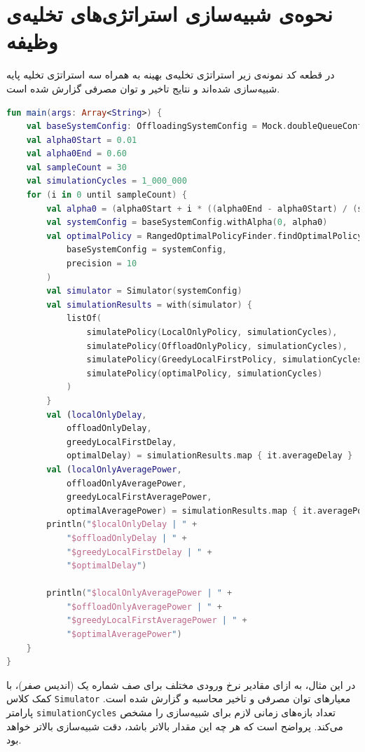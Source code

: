 \section{نحوه‌ی شبیه‌سازی استراتژی‌های تخلیه‌ی وظیفه}
در قطعه کد نمونه‌ی زیر استراتژی تخلیه‌ی بهینه به همراه سه استراتژی تخلیه پایه شبیه‌سازی شده‌اند و نتایج تاخیر و توان مصرفی گزارش شده است.
\begin{LTR}
	\begin{lstlisting}[language=Kotlin, caption={شبیه‌سازی استراتژی‌های تخلیه‌ی وظیفه}, captiondirection=RTL, label={lst:sim}, showstringspaces=false]
fun main(args: Array<String>) {
	val baseSystemConfig: OffloadingSystemConfig = Mock.doubleQueueConfig()
	val alpha0Start = 0.01
	val alpha0End = 0.60
	val sampleCount = 30
	val simulationCycles = 1_000_000
	for (i in 0 until sampleCount) {
		val alpha0 = (alpha0Start + i * ((alpha0End - alpha0Start) / (sampleCount - 1)))
		val systemConfig = baseSystemConfig.withAlpha(0, alpha0)
		val optimalPolicy = RangedOptimalPolicyFinder.findOptimalPolicy(
			baseSystemConfig = systemConfig,
			precision = 10
		)
		val simulator = Simulator(systemConfig)
		val simulationResults = with(simulator) {
			listOf(
				simulatePolicy(LocalOnlyPolicy, simulationCycles),
				simulatePolicy(OffloadOnlyPolicy, simulationCycles),
				simulatePolicy(GreedyLocalFirstPolicy, simulationCycles),
				simulatePolicy(optimalPolicy, simulationCycles)
			)
		}
		val (localOnlyDelay,
			offloadOnlyDelay,
			greedyLocalFirstDelay,
			optimalDelay) = simulationResults.map { it.averageDelay }
		val (localOnlyAveragePower,
			offloadOnlyAveragePower,
			greedyLocalFirstAveragePower,
			optimalAveragePower) = simulationResults.map { it.averagePowerConsumption }
		println("$localOnlyDelay | " +
			"$offloadOnlyDelay | " +
			"$greedyLocalFirstDelay | " +
			"$optimalDelay")
		
		println("$localOnlyAveragePower | " +
			"$offloadOnlyAveragePower | " +
			"$greedyLocalFirstAveragePower | " +
			"$optimalAveragePower")
	}
}
	\end{lstlisting}
\end{LTR}
در این مثال، به ازای مقادیر نرخ ورودی مختلف برای صف شماره یک (اندیس صفر)، با کمک کلاس \texttt{\footnotesize Simulator} معیارهای توان مصرفی و تاخیر محاسبه و گزارش شده است. پارامتر \texttt{\footnotesize simulationCycles} تعداد بازه‌های زمانی لازم برای شبیه‌سازی را مشخص می‌کند. پرواضح است که هر چه این مقدار بالاتر باشد، دقت شبیه‌سازی بالاتر خواهد بود. 
\newpage